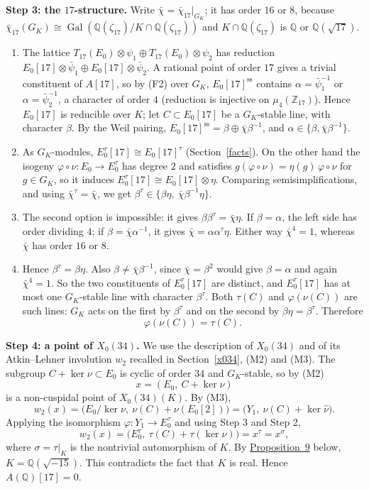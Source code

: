 \documentclass[11pt]{article}
\newcommand{\Q}{\mathbb Q}
\newcommand{\Z}{\mathbb Z}
\DeclareMathOperator{\Gal}{Gal}
\begin{document}
\textbf{Step 3: the \(17\)-structure.} Write \(\bar\chi=\bar\chi_{17}|_{G_K}\); it has order
\(16\) or \(8\), because \(\bar\chi_{17}(G_K)\cong\Gal(\Q(\zeta_{17})/K\cap\Q(\zeta_{17}))\) and
\(K\cap\Q(\zeta_{17})\) is \(\Q\) or \(\Q(\sqrt{17})\).
\begin{enumerate}
\item The lattice \(T_{17}(E_0)\otimes\psi_1\oplus T_{17}(E_0)\otimes\psi_2\) has reduction
\(E_0[17]\otimes\bar\psi_1\oplus E_0[17]\otimes\bar\psi_2\). A rational point of order \(17\)
gives a trivial constituent of \(A[17]\), so by (F2) over \(G_K\), \(E_0[17]^{\mathrm{ss}}\)
contains \(\alpha=\bar\psi_1^{-1}\) or \(\alpha=\bar\psi_2^{-1}\), a character of order \(4\)
(reduction is injective on \(\mu_4(\Z_{17})\)). Hence \(E_0[17]\) is reducible over \(K\); let
\(C\subset E_0[17]\) be a \(G_K\)-stable line, with character \(\beta\). By the Weil pairing,
\(E_0[17]^{\mathrm{ss}}=\beta\oplus\bar\chi\beta^{-1}\), and
\(\alpha\in\{\beta,\bar\chi\beta^{-1}\}\).
\item As \(G_K\)-modules, \(E_0^\tau[17]\cong E_0[17]^\tau\) (Section~\ref{facts}). On the other
hand the isogeny \(\varphi\circ\nu:E_0\to E_0^\tau\) has degree \(2\) and satisfies
\(g(\varphi\circ\nu)=\eta(g)\,\varphi\circ\nu\) for \(g\in G_K\), so it induces
\(E_0^\tau[17]\cong E_0[17]\otimes\eta\). Comparing semisimplifications, and using
\(\bar\chi^\tau=\bar\chi\), we get \(\beta^\tau\in\{\beta\eta,\ \bar\chi\beta^{-1}\eta\}\).
\item The second option is impossible: it gives \(\beta\beta^\tau=\bar\chi\eta\). If
\(\beta=\alpha\), the left side has order dividing \(4\); if \(\beta=\bar\chi\alpha^{-1}\), it
gives \(\bar\chi=\alpha\alpha^\tau\eta\). Either way \(\bar\chi^4=1\), whereas \(\bar\chi\) has
order \(16\) or \(8\).
\item Hence \(\beta^\tau=\beta\eta\). Also \(\beta\neq\bar\chi\beta^{-1}\), since
\(\bar\chi=\beta^2\) would give \(\beta=\alpha\) and again \(\bar\chi^4=1\). So the two
constituents of \(E_0^\tau[17]\) are distinct, and \(E_0^\tau[17]\) has at most one
\(G_K\)-stable line with character \(\beta^\tau\). Both \(\tau(C)\) and \(\varphi(\nu(C))\) are
such lines: \(G_K\) acts on the first by \(\beta^\tau\) and on the second by
\(\beta\eta=\beta^\tau\). Therefore
\[\varphi(\nu(C))=\tau(C).\]
\end{enumerate}

\textbf{Step 4: a point of \(X_0(34)\).} We use the description of \(X_0(34)\) and of its
Atkin--Lehner involution \(w_2\) recalled in Section~\ref{x034}, (M2) and (M3). The subgroup
\(C+\ker\nu\subset E_0\) is cyclic of order \(34\) and \(G_K\)-stable, so by (M2)
\[x=(E_0,\ C+\ker\nu)\]
is a non-cuspidal point of \(X_0(34)(K)\). By (M3),
\[w_2(x)=\bigl(E_0/\ker\nu,\ \nu(C)+\nu(E_0[2])\bigr)=\bigl(Y_1,\ \nu(C)+\ker\hat\nu\bigr).\]
Applying the isomorphism \(\varphi:Y_1\to E_0^\tau\) and using Step 3 and Step 2,
\[w_2(x)=\bigl(E_0^\tau,\ \tau(C)+\tau(\ker\nu)\bigr)=x^\tau=x^\sigma,\]
where \(\sigma=\tau|_K\) is the nontrivial automorphism of \(K\). By
\hyperref[prop-x034]{Proposition~9} below, \(K=\Q(\sqrt{-15})\). This contradicts the fact that
\(K\) is real. Hence \(A(\Q)[17]=0\).
\end{document}
